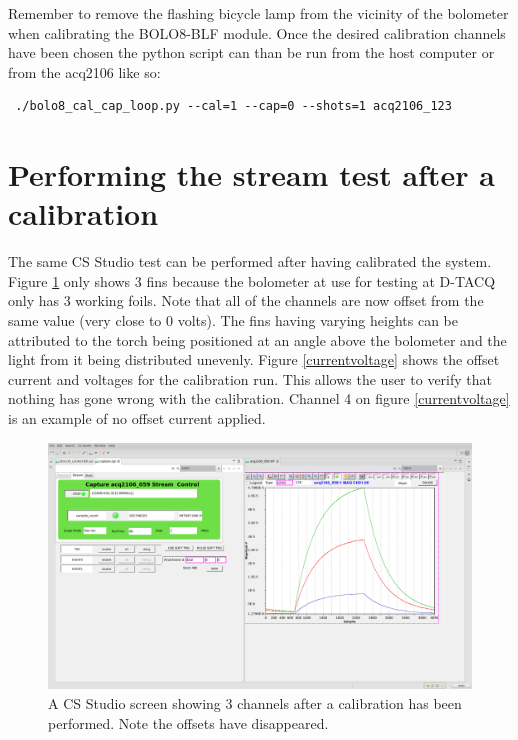 \documentclass{article}
\begin{document}
Remember to remove the flashing bicycle lamp from the vicinity of the bolometer when calibrating the BOLO8-BLF module.
Once the desired calibration channels have been chosen the python script can than be run from the host computer or from the acq2106 like so:

\begin{verbatim} ./bolo8_cal_cap_loop.py --cal=1 --cap=0 --shots=1 acq2106_123\end{verbatim}




\section{Performing the stream test after a calibration}
The same CS Studio test can be performed after having calibrated the system.
Figure \ref{3fincal} only shows 3 fins because the bolometer at use for testing at \mbox{D-TACQ} only has 3 working foils.
Note that all of the channels are now offset from the same value (very close to 0 volts).
The fins having varying heights can be attributed to the torch being positioned at an angle above the bolometer and the light from it being distributed unevenly.
Figure \ref{currentvoltage} shows the offset current and voltages for the calibration run.
This allows the user to verify that nothing has gone wrong with the calibration.
Channel 4 on figure \ref{currentvoltage} is an example of no offset current applied.

\begin{figure} [hbt!]
	\centering
	\includegraphics[width=5.0in]{images/3-fin-cal.png}
	\caption{A CS Studio screen showing 3 channels after a calibration has been performed. Note the offsets have disappeared.}
	\label{3fincal}
\end{figure}
\end{document}
